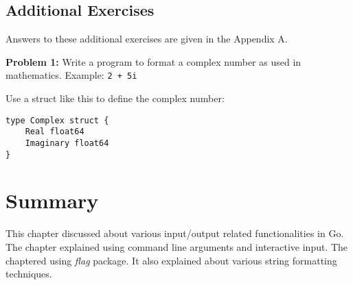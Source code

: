 \subsection{Additional Exercises}

Answers to these additional exercises are given in the Appendix A.

\textbf{Problem 1:} Write a program to format a complex number as used in mathematics.  Example: \texttt{2 + 5i}

Use a struct like this to define the complex number:

\begin{lstlisting}[numbers=none]
type Complex struct {
    Real float64
    Imaginary float64
}
\end{lstlisting}


\section*{Summary}

This chapter discussed about various input/output related
functionalities in Go.  The chapter explained using command line
arguments and interactive input.  The chaptered using \textit{flag}
package.  It also explained about various string formatting
techniques.
